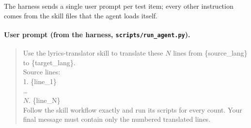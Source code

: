 \documentclass[11pt]{article}
\begin{document}
The harness sends a single user prompt per test item; every other instruction comes from the skill files that the agent loads itself.

\paragraph{User prompt (from the harness, \texttt{scripts/run\_agent.py}).}
\begin{quote}
\small\ttfamily
Use the lyrics-translator skill to translate these $N$ lines from \{source\_lang\} to \{target\_lang\}.\\[4pt]
Source lines:\\
1. \{line\_1\}\\
\ldots\\
$N$. \{line\_N\}\\[4pt]
Follow the skill workflow exactly and run its scripts for every count. Your final message must contain only the numbered translated lines.
\end{quote}
\end{document}
